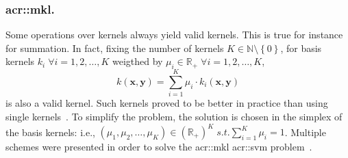         \subsubsection{\acrlong*{acr::mkl}.}
            Some operations over kernels always yield valid kernels.
            This is true for instance for summation.
            In fact, fixing the number of kernels $K\in \mathbb{N} \setminus \left\{0\right\}$, for basis kernels $k_i \; \forall i = 1, 2, \dots, K$ weigthed by $\mu_i \in \mathbb{R}_+\; \forall i = 1, 2, \dots, K$,
            \begin{equation}
                \label{eq::mkl}
                k(\bm{x}, \bm{y}) = \sum_{i=1}^K \mu_i \cdot k_i(\bm{x}, \bm{y})
            \end{equation}
            is also a valid kernel.
            Such kernels proved to be better in practice than using single kernels~\parencite{lanckriet2004statistical}.
            To simplify the problem, the solution is chosen in the simplex of the basis kernels: i.e., $ (\mu_1, \mu_2, \dots, \mu_K) \in (\mathbb{R}_+)^K  \; s.t. \sum_{i=1}^K \mu_i = 1$.
            Multiple schemes were presented in order to solve the \gls{acr::mkl} \gls{acr::svm} problem~\parencite{rakotomamonjy2008simplemkl,varma2009more,sun2010multiple}.
            
